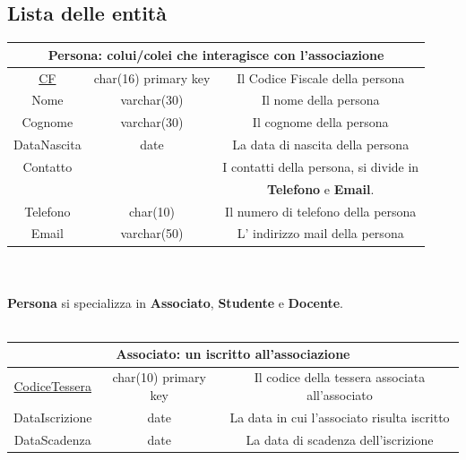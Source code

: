 \documentclass[11pt]{article}
\begin{document}
	\subsection{Lista delle entità}
		\begin{tabular}{|c|c|c|}
			\hline
			\multicolumn{3}{|c|}{\textbf{Persona}: colui/colei che interagisce con l'associazione}\\
			\hline
			\underline{CF} & char(16) primary key & Il Codice Fiscale della persona\\
			\hline
			Nome & varchar(30) & Il nome della persona\\
			\hline
			Cognome & varchar(30) & Il cognome della persona\\
			\hline
			DataNascita & date & La data di nascita della persona\\
			\hline
			Contatto &  & I contatti della persona, si divide in\\
			&  &\textbf{Telefono} e \textbf{Email}.\\
			Telefono & char(10) & Il numero di telefono della persona\\
			Email & varchar(50) & L' indirizzo mail della persona\\
			\hline
		\end{tabular}
		\\\\ \textbf{Persona} si specializza in \textbf{Associato}, \textbf{Studente} e \textbf{Docente}.\\\\
		\begin{tabular}{|c|c|c|}
			\hline
			\multicolumn{3}{|c|}{\textbf{Associato}: un iscritto all'associazione}\\
			\hline
			\underline{CodiceTessera} & char(10) primary key & Il codice della tessera associata all'associato\\
			\hline
			DataIscrizione & date & La data in cui l'associato risulta iscritto\\
			\hline
			DataScadenza & date & La data di scadenza dell'iscrizione\\
			\hline
		\end{tabular}
		\\\\\\
\end{document}
